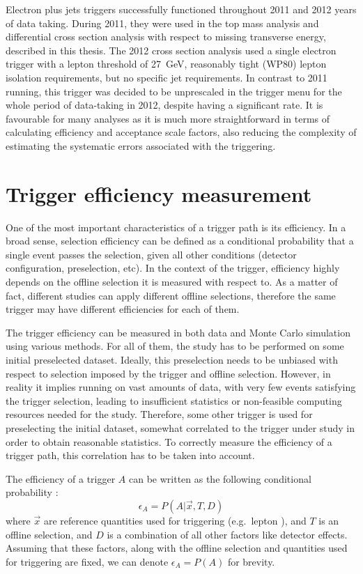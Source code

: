 Electron plus jets triggers successfully functioned throughout 2011 and 2012 years of data taking. During 2011, they
were used in the top mass analysis and differential cross section analysis with respect to missing transverse energy,
described in this thesis. The 2012 cross section analysis used a single electron trigger with a lepton \pt threshold of
\SI{27}{\GeV}, reasonably tight (WP80) lepton isolation requirements, but no specific jet requirements. In contrast to
2011 running, this trigger was decided to be unprescaled in the trigger menu for the whole period of data-taking in
2012, despite having a significant rate. It is favourable for many analyses as it is much more straightforward in terms
of calculating efficiency and acceptance scale factors, also reducing the complexity of estimating the systematic errors
associated with the triggering.

\section{Trigger efficiency measurement}
\label{s:trigger_efficicency_measurement}
One of the most important characteristics of a trigger path is its efficiency. In a broad sense, selection efficiency
can be defined as a conditional probability that a single event passes the selection, given all other conditions
(detector configuration, preselection, etc). In the context of the trigger, efficiency highly depends on the offline
selection it is measured with respect to. As a matter of fact, different studies can apply different offline selections,
therefore the same trigger may have different efficiencies for each of them.

The trigger efficiency can be measured in both data and Monte Carlo simulation using various methods. For all of them,
the study has to be performed on some initial preselected dataset. Ideally, this preselection needs to be unbiased with
respect to selection imposed by the trigger and offline selection. However, in reality it implies running on vast
amounts of data, with very few events satisfying the trigger selection, leading to insufficient statistics or
non-feasible computing resources needed for the study. Therefore, some other trigger is used for preselecting the
initial dataset, somewhat correlated to the trigger under study in order to obtain reasonable statistics. To correctly
measure the efficiency of a trigger path, this correlation has to be taken into account.

The efficiency of a trigger $A$ can be written as the following conditional probability \autocite{selection_efficiency}:
\begin{equation}
\epsilon_{A} = P(A | \vec{x}, T, D)
\end{equation}
where $\vec{x}$ are reference quantities used for triggering (e.g.\ lepton \pt), and $T$ is an offline selection, and
$D$ is a combination of all other factors like detector effects. Assuming that these factors, along with the offline
selection and quantities used for triggering are fixed, we can denote $\epsilon_{A} = P(A)$ for brevity.

